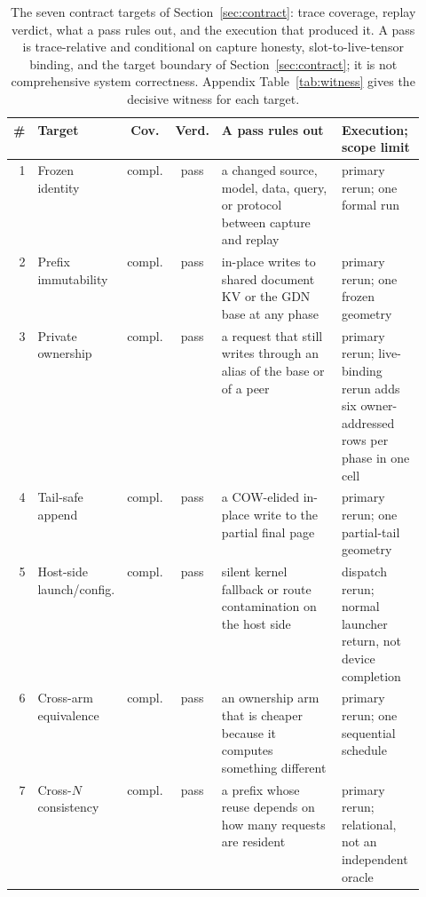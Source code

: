 \begin{table}[H]
\caption{The seven contract targets of Section~\ref{sec:contract}: trace
coverage, replay verdict, what a pass rules out, and the execution that
produced it.  A pass is trace-relative and conditional on capture honesty,
slot-to-live-tensor binding, and the target boundary of
Section~\ref{sec:contract}; it is not comprehensive system correctness.
Appendix Table~\ref{tab:witness} gives the decisive witness for each target.}
\label{tab:target-coverage}
\centering\scriptsize
\setlength{\tabcolsep}{3.2pt}
\begin{tabular}{@{}rlccp{0.33\linewidth}p{0.21\linewidth}@{}}
\toprule
\# & Target & Cov. & Verd. & A pass rules out & Execution; scope limit \\
\midrule
1 & Frozen identity & compl. & pass & a changed source, model, data, query, or protocol between capture and replay & primary rerun; one formal run \\
2 & Prefix immutability & compl. & pass & in-place writes to shared document KV or the GDN base at any phase & primary rerun; one frozen geometry \\
3 & Private ownership & compl. & pass & a request that still writes through an alias of the base or of a peer & primary rerun; live-binding rerun adds six owner-addressed rows per phase in one cell \\
4 & Tail-safe append & compl. & pass & a COW-elided in-place write to the partial final page & primary rerun; one partial-tail geometry \\
5 & Host-side launch/config. & compl. & pass & silent kernel fallback or route contamination on the host side & dispatch rerun; normal launcher return, not device completion \\
6 & Cross-arm equivalence & compl. & pass & an ownership arm that is cheaper because it computes something different & primary rerun; one sequential schedule \\
7 & Cross-$N$ consistency & compl. & pass & a prefix whose reuse depends on how many requests are resident & primary rerun; relational, not an independent oracle \\
\bottomrule
\end{tabular}
\end{table}
